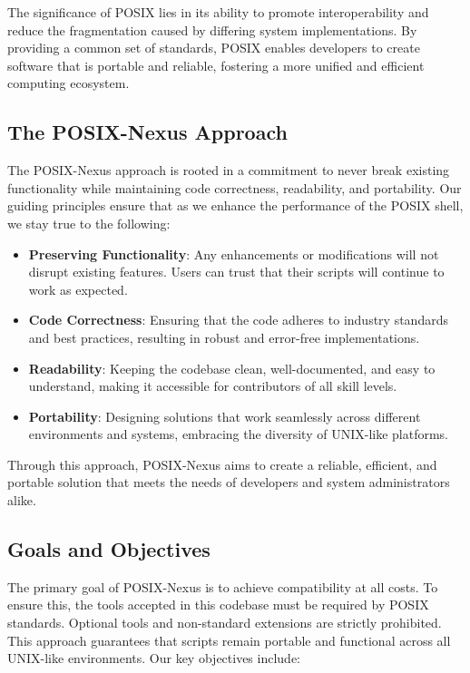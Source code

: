 The significance of POSIX lies in its ability to promote interoperability and reduce the fragmentation caused by differing system implementations. By providing a common set of standards, POSIX enables developers to create software that is portable and reliable, fostering a more unified and efficient computing ecosystem.
\\
\subsection{The POSIX-Nexus Approach}

The POSIX-Nexus approach is rooted in a commitment to never break existing functionality while maintaining code correctness, readability, and portability. Our guiding principles ensure that as we enhance the performance of the POSIX shell, we stay true to the following:

\begin{itemize} 
    \item \textbf{Preserving Functionality}: Any enhancements or modifications will not disrupt existing features. Users can trust that their scripts will continue to work as expected. 
    \item \textbf{Code Correctness}: Ensuring that the code adheres to industry standards and best practices, resulting in robust and error-free implementations. 
    \item \textbf{Readability}: Keeping the codebase clean, well-documented, and easy to understand, making it accessible for contributors of all skill levels. 
    \item \textbf{Portability}: Designing solutions that work seamlessly across different environments and systems, embracing the diversity of UNIX-like platforms. 
\end{itemize}

Through this approach, POSIX-Nexus aims to create a reliable, efficient, and portable solution that meets the needs of developers and system administrators alike.

\newpage

\subsection{Goals and Objectives}

The primary goal of POSIX-Nexus is to achieve compatibility at all costs. To ensure this, the tools accepted in this codebase must be required by POSIX standards. Optional tools and non-standard extensions are strictly prohibited. This approach guarantees that scripts remain portable and functional across all UNIX-like environments.
Our key objectives include:

